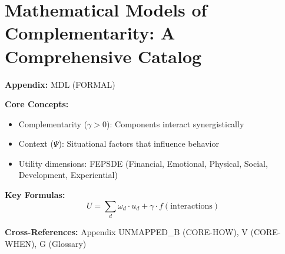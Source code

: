 
\chapter{Mathematical Models of Complementarity: A Comprehensive Catalog}
\label{app:formal-models}

\begin{abstract}
This appendix presents the key concepts and formalizations for Mathematical Models of Complementarity: A Comprehensive Catalog.
It provides theoretical foundations, practical applications, and integration
points with other components of the Evidence-Based Framework (EBF).
The content supports decision-making and behavioral analysis in the context
of complementarity and context-dependent outcomes.
\end{abstract}

\begin{tcolorbox}[colback=blue!5!white, colframe=blue!75!black,
    title=Quick Reference: Mathematical Models of Complementarity: A Comprehensive Catalog]

\textbf{Appendix:} MDL (FORMAL)

\textbf{Core Concepts:}
\begin{itemize}[nosep]
\item Complementarity ($\gamma > 0$): Components interact synergistically
\item Context ($\Psi$): Situational factors that influence behavior
\item Utility dimensions: FEPSDE (Financial, Emotional, Physical, Social, Development, Experiential)
\end{itemize}

\textbf{Key Formulas:}
\begin{equation}
U = \sum_d \omega_d \cdot u_d + \gamma \cdot f(\text{interactions})
\end{equation}

\textbf{Cross-References:} Appendix UNMAPPED_B (CORE-HOW), V (CORE-WHEN), G (Glossary)
\end{tcolorbox}





